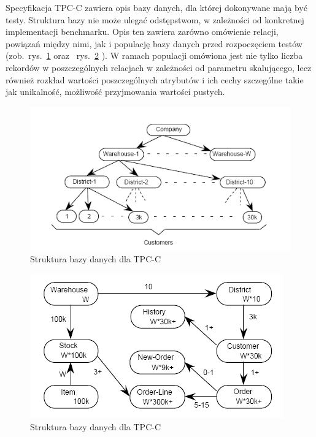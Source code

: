 Specyfikacja TPC-C zawiera opis bazy danych, dla której dokonywane mają być testy. Struktura
bazy nie może ulegać odstępstwom, w zależności od konkretnej implementacji benchmarku.
Opis ten zawiera zarówno omówienie relacji, powiązań między nimi, jak i populację bazy danych
przed rozpoczęciem testów (zob.~rys.~\ref{rys:tpc_db_structure} oraz ~rys.~\ref{rys:tpc_db_structure2} ). 
W ramach populacji omówiona jest nie tylko liczba rekordów w poszczególnych relacjach 
w zależności od parametru skalującego, lecz również rozkład wartości 
poszczególnych atrybutów i ich cechy szczególne takie jak unikalność, możliwość
przyjmowania wartości pustych.

\begin{figure}[h]
\begin{center}
\includegraphics[width=0.8\linewidth]{figures/tpc/tpc_db_structure.png}
\end{center}
\caption{Struktura bazy danych dla TPC-C~\cite{TPC1}}\label{rys:tpc_db_structure}
\end{figure}

\begin{figure}[h]
\begin{center}
\includegraphics[width=0.8\linewidth]{figures/tpc/tpc_db_structure2.png}
\end{center}
\caption{Struktura bazy danych dla TPC-C~\cite{TPC1}}\label{rys:tpc_db_structure2}
\end{figure}

